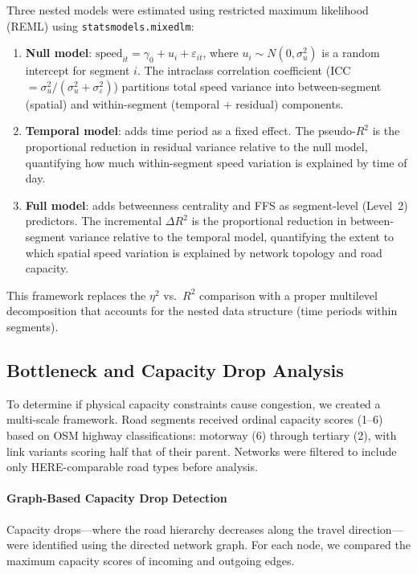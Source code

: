 \documentclass[review,authoryear]{elsarticle}
\begin{document}
Three nested models were estimated using restricted maximum likelihood (REML) using \texttt{statsmodels.mixedlm}:

\begin{enumerate}
  \item \textbf{Null model}: $\text{speed}_{it} = \gamma_0 + u_i + \varepsilon_{it}$, where $u_i \sim N(0, \sigma^2_u)$ is a random intercept for segment $i$. The intraclass correlation coefficient (ICC $= \sigma^2_u / (\sigma^2_u + \sigma^2_\varepsilon)$) partitions total speed variance into between-segment (spatial) and within-segment (temporal + residual) components.
  \item \textbf{Temporal model}: adds time period as a fixed effect. The pseudo-$R^2$ is the proportional reduction in residual variance relative to the null model, quantifying how much within-segment speed variation is explained by time of day.
  \item \textbf{Full model}: adds betweenness centrality and FFS as segment-level (Level~2) predictors. The incremental $\Delta R^2$ is the proportional reduction in between-segment variance relative to the temporal model, quantifying the extent to which spatial speed variation is explained by network topology and road capacity.
\end{enumerate}

This framework replaces the $\eta^2$ vs.\ $R^2$ comparison with a proper multilevel decomposition that accounts for the nested data structure (time periods within segments).

\subsection{Bottleneck and Capacity Drop Analysis}
\label{sec:bottleneck}

To determine if physical capacity constraints cause congestion, we created a multi-scale framework. Road segments received ordinal capacity scores (1--6) based on OSM highway classifications: motorway (6) through tertiary (2), with link variants scoring half that of their parent. Networks were filtered to include only HERE-comparable road types before analysis.

\paragraph{Graph-Based Capacity Drop Detection}

Capacity drops---where the road hierarchy decreases along the travel direction---were identified using the directed network graph. For each node, we compared the maximum capacity scores of incoming and outgoing edges.
\end{document}
